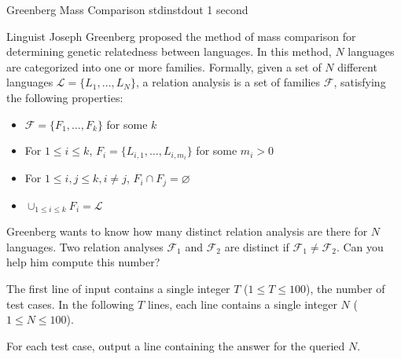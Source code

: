 \begin{problem}{Greenberg Mass Comparison}
{stdin}{stdout}
{1 second}{}{}

Linguist Joseph Greenberg proposed the method of mass comparison for determining genetic relatedness between languages. In this method, $N$ languages are categorized into one or more families. Formally, given a set of $N$ different languages $\mathcal{L} = \{L_1, \hdots, L_N\}$, a relation analysis is a set of families $\mathcal{F}$, satisfying the following properties:
\begin{itemize}
\item $\mathcal{F} = \{F_1, \hdots, F_k\}$ for some $k$
\item For $1 \le i \le k$, $F_i = \{L_{i,1}, \hdots, L_{i,m_i}\}$ for some $m_i > 0$
\item For $1 \le i,j \le k, i \ne j$, $F_i \cap F_j = \varnothing$
\item $\cup_{1 \le i \le k}{F_i} = \mathcal{L}$
\end{itemize}

Greenberg wants to know how many distinct relation analysis are there for $N$ languages. Two relation analyses $\mathcal{F}_1$ and $\mathcal{F}_2$ are distinct if $\mathcal{F}_1 \ne \mathcal{F}_2$. Can you help him compute this number?

\InputFile

The first line of input contains a single integer $T$ ($1 \le T \le 100$), the number of test cases.
In the following $T$ lines, each line contains a single integer $N$ ($1 \le N \le 100$).

\OutputFile

For each test case, output a line containing the answer for the queried $N$.

\Examples

\begin{example}
%
\end{example}

\end{problem}
